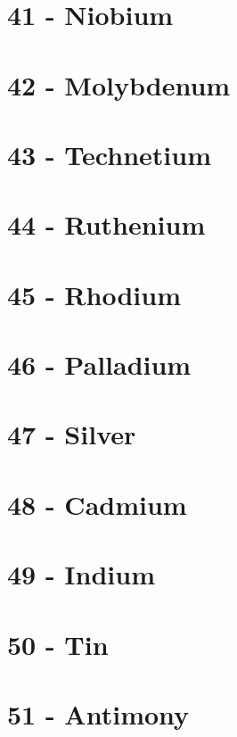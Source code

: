 \documentclass{book}
\begin{document}
\section{41 - Niobium}
\label{sec:elem-niobium}

\section{42 - Molybdenum}
\label{sec:elem-molybdenum}

\section{43 - Technetium}
\label{sec:elem-technetium}

\section{44 - Ruthenium}
\label{sec:elem-ruthenium}

\section{45 - Rhodium}
\label{sec:elem-rhodium}

\section{46 - Palladium}
\label{sec:elem-palladium}

\section{47 - Silver}
\label{sec:elem-silver}

\section{48 - Cadmium}
\label{sec:elem-cadmium}

\section{49 - Indium}
\label{sec:elem-indium}

\section{50 - Tin}
\label{sec:elem-tin}

\section{51 - Antimony}
\label{sec:elem-antimony}
\end{document}
